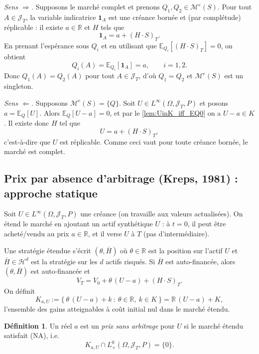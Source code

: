 \documentclass[12pt,a4paper]{article}
\makeatletter
\numberwithin{equation}{section}
\theoremstyle{plain} %
\theoremstyle{definition} %
\newtheorem{definition}{Définition}          %
\theoremstyle{remark} %
\theoremstyle{myexample}
\theoremstyle{definition}
\renewenvironment{proof}[1][\proofname]{%
  \par\vspace{0.8em}%
  \pushQED{\qed}%
  \normalfont\color{cyan}%
  \topsep6\p@\@plus6\p@\relax
  \trivlist
  \item[\hskip\labelsep\bfseries\color{cyan}#1\@addpunct{.}]\ignorespaces
}{%
  \popQED\endtrivlist\vspace{0.8em}%
}
\newcommand{\E}{\mathbb{E}}
\newcommand{\RR}{\mathbb{R}}
\newcommand{\indic}{\mathbf{1}}
\makeatother
\begin{document}
\begin{proof}[Preuve du Théorème~\ref{thm:complet_singleton}]
\emph{Sens $\Rightarrow$.} Supposons le marché complet et prenons $Q_1,Q_2\in\mathcal{M}^e(S)$.  
Pour tout $A\in\mathcal{J}_T$, la variable indicatrice $\indic_A$ est une créance bornée et (par complétude) réplicable : il existe $a\in\RR$ et $H$ tels que
\[
\indic_A = a + (H\cdot S)_T.
\]
En prenant l’espérance sous $Q_i$ et en utilisant que $\E_{Q_i}[(H\cdot S)_T]=0$, on obtient
\[
Q_i(A)=\E_{Q_i}[\indic_A]=a,\qquad i=1,2.
\]
Donc $Q_1(A)=Q_2(A)$ pour tout $A\in\mathcal{J}_T$, d’où $Q_1=Q_2$ et $\mathcal{M}^e(S)$ est un singleton.



\smallskip
\emph{Sens $\Leftarrow$.} Supposons $\mathcal{M}^e(S)=\{Q\}$.
Soit $U\in L^\infty(\Omega,\mathcal{J}_T,P)$ et posons $a=\E_Q[U]$. Alors $\E_Q[U-a]=0$, et par le \ref{lem:UinK_iff_EQ0} on a $U-a\in K$. Il existe donc $H$ tel que
\[
U = a + (H\cdot S)_T,
\]
c’est-à-dire que $U$ est réplicable. Comme ceci vaut pour toute créance bornée, le marché est complet.

\end{proof}


\subsection{Prix par absence d’arbitrage (Kreps, 1981) : approche statique}

Soit $U\in L^\infty(\Omega,\mathcal{J}_T,P)$ une créance (on travaille aux valeurs actualisées).  
On étend le marché en ajoutant un actif synthétique $U$ : à $t=0$, il peut être acheté/vendu au prix $a\in\RR$, et il verse $U$ à $T$ (pas d’intermédiaire).

Une stratégie étendue s’écrit $(\theta,\bar H)$ où $\theta\in\RR$ est la position sur l’actif $U$ et $\bar H\in\mathcal{H}^{d}$ est la stratégie sur les $d$ actifs risqués.  
Si $\bar H$ est auto-financée, alors $(\theta,\bar H)$ est auto-financée et
\[
V_T = V_0 + \theta\,(U-a) + (H\cdot S)_T.
\]
On définit
\[
K_{a,U} := \{\ \theta\,(U-a) + k \ :\ \theta\in\RR,\ k\in K\ \}
= \RR\,(U-a)+K,
\]
l’ensemble des gains atteignables à coût initial nul dans le marché étendu.

\begin{definition}
Un réel $a$ est un \emph{prix sans arbitrage} pour $U$ si le marché étendu satisfait (NA), i.e.
\[
K_{a,U}\cap L_+^0(\Omega,\mathcal{J}_T,P)=\{0\}.
\]
\end{definition}
\end{document}
